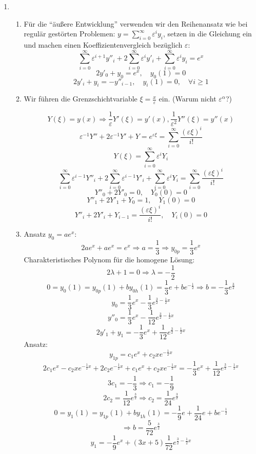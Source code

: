 \documentclass[a4paper,11pt]{scrartcl}
\newcommand*{\eps}{\varepsilon}
\newcommand*{\sm}{\sum_{i=0}^\infty}
\begin{document}
\begin{enumerate}[label*=\textbf{8.\arabic*.}]

\item \begin{enumerate}
  \item
    Für die ``äußere Entwicklung'' verwenden wir den Reihenansatz wie bei regulär gestörten Problemen:
    $y = \sm \eps^i y_i$, setzen in die Gleichung ein und machen einen
    Koeffizientenvergleich bezüglich $\eps$:
    \[ \sm \eps^{i+1} y''_i + 2 \sm \eps^{i} y'_i + \sm \eps^i y_i = e^x \]
    \[ 2y'_0 + y_0 = e^x, \quad y_0(1)=0 \]
    \[ 2y'_i + y_i = -y''_{i-1}, \quad y_i(1)=0, \quad \forall i \geq 1\]

  \item
    Wir führen die Grenzschichtvariable $\xi = \frac{x}{\eps}$ ein. (Warum nicht
    $\eps^\alpha$?)

    \[Y(\xi) = y(x) \Rightarrow \frac{1}{\eps} Y'(\xi) = y'(x),
      \frac{1}{\eps^2} Y''(\xi) = y''(x)\]
    \[\eps^{-1} Y'' + 2 \eps^{-1} Y' + Y = e^{\eps \xi} = \sm \frac{(\eps \xi)^i}{i!}\]
    \[Y(\xi) = \sm \eps^i Y_i\]
    \[\sm \eps^{i-1} Y''_i + 2 \sm \eps^{i-1} Y'_i + \sm \eps^i Y_i = \sm
      \frac{(\eps \xi)^i}{i!}\]
    \[ Y''_0 + 2 Y'_0 = 0, \quad Y_0(0) = 0\]
    \[ Y''_1 + 2 Y'_1 + Y_0 = 1, \quad Y_1(0) = 0\]
    \[ Y''_i + 2 Y'_i + Y_{i-1} = \frac{(\eps \xi)^i}{i!}, \quad Y_i(0) = 0\]

  \item
    Ansatz $y_0 = a e^x$:
    \[2ae^x + a e^x = e^x \Rightarrow a = \frac{1}{3} \Rightarrow y_{0p} =
      \frac{1}{3}e^x \]
    Charakteristisches Polynom für die homogene Lösung:
    \[2 \lambda + 1 = 0 \Rightarrow \lambda=-\frac{1}{2}\]
    \[0 = y_0(1) = y_{0p}(1) + b y_{0h}(1) = \frac{1}{3} e + b e^{-\frac{1}{2}}
      \Rightarrow b = - \frac{1}{3} e^{\frac{3}{2}} \]
    \[y_0 = \frac{1}{3}e^x - \frac{1}{3} e^{\frac{3}{2} - \frac{1}{2}x}\]
    \[y''_0 = \frac{1}{3}e^x - \frac{1}{12} e^{\frac{3}{2} - \frac{1}{2}x}\]
    \[ 2 y'_1 + y_1 = -\frac{1}{3} e^x + \frac{1}{12}e^{\frac{3}{2} - \frac{1}{2}x}\]
    Ansatz:
    \[y_{1p} = c_1 e^x + c_2 x e^{-\frac{1}{2}x}\]
    \[2 c_1 e^x - c_2 x e^{-\frac{1}{2}x} + 2c_2 e^{-\frac{1}{2}x} + c_1 e^x +
      c_2 x e^{-\frac{1}{2} x}=  -\frac{1}{3} e^x + \frac{1}{12}e^{\frac{3}{2} - \frac{1}{2}x}\]
    \[3c_1 = -\frac{1}{3} \Rightarrow c_1 = -\frac{1}{9}\]
    \[2c_2 = \frac{1}{12} e^{\frac{3}{2}} \Rightarrow c_2 = \frac{1}{24}e^{\frac{3}{2}}\]
    \[0 = y_1(1) = y_{1p}(1) + b y_{1h}(1) = -\frac{1}{9}e + \frac{1}{24} e + b
      e^{-\frac{1}{2}} \]
    \[\Rightarrow b = \frac{5}{72} e^{\frac{3}{2}} \]
    \[y_1 = -\frac{1}{9}e^x +  (3x + 5) \frac{1}{72}e^{\frac{3}{2}-\frac{1}{2}x} \]


\end{enumerate}
\end{enumerate}
\end{document}
